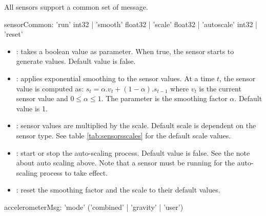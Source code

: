 \label{sensorCommonMsgs}

All sensors support a common set of message. 

\begin{rail}
sensorCommon:  'run' 	int32
			|  'smooth' float32 
			|  'scale' 	float32  
			|  'autoscale' int32  
			|  'reset'  
\end{rail}

\begin{itemize}
\item {}: takes a boolean value as parameter. When true, the sensor starts to generate values. Default value is false.
\item {}: applies exponential smoothing to the sensor values. At a time $t$, the sensor value is computed as:
$s_t = \alpha.v_t + (1-\alpha).s_{t-1}$ where $v_t$ is the current sensor value and $0 \leqslant \alpha \leqslant 1$.
The parameter is the smoothing factor $\alpha$. Default value is 1.
\item {}: sensor values are multiplied by the scale. Default scale is dependent on the sensor type. See table \ref{tab:sensorsscales} for the default scale values.
\item {}: start or stop the auto-scaling process. Default value is false. See the note about auto scaling above. Note that a sensor must be running for the auto-scaling process to take effect.
\item {}: reset the smoothing factor and the scale to their default values.
\end{itemize}


\label{sensorSpecifcMsgs}


\begin{rail}
accelerometerMsg: 	  'mode' ('combined' | 'gravity' | 'user')
\end{rail}

